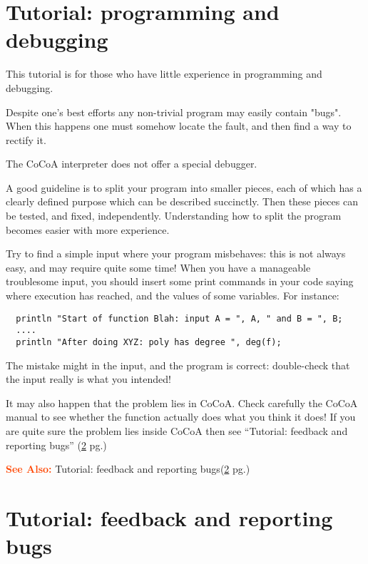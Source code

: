 \documentclass[a4paper]{mybook}
\newcommand\SeeAlso{\par\textcolor{OrangeRed}{\textbf{\large See Also: }}}
\begin{document}
\section{Tutorial: programming and debugging}
\label{Tutorial: programming and debugging}

        
This tutorial is for those who have little experience in
programming and debugging.
\par 
Despite one's best efforts any non-trivial program may easily contain "bugs".
When this happens one must somehow locate the fault,
and then find a way to rectify it.
\par 
The CoCoA interpreter does not offer a special debugger.
\par 
A good guideline is to split your program into smaller pieces,
each of which has a clearly defined purpose which can be described succinctly.
Then these pieces can be tested, and fixed, independently.
Understanding how to split the program becomes easier with more experience.
\par 
Try to find a simple input where your program misbehaves:
this is not always easy, and may require quite some time!
When you have a manageable troublesome input, you should insert
some print commands in your code saying where execution has reached,
and the values of some variables.
For instance:
\begin{verbatim}
  println "Start of function Blah: input A = ", A, " and B = ", B;
  ....
  println "After doing XYZ: poly has degree ", deg(f);
\end{verbatim}
The mistake might in the input, and the program is correct:
double-check that the input really is what you intended!
\par 
It may also happen that the problem lies in CoCoA.
Check carefully the CoCoA manual to see whether the function actually
does what you think it does!
If you are quite sure the problem lies inside CoCoA then see
``Tutorial: feedback and reporting bugs'' (\ref{Tutorial: feedback and reporting bugs} pg.\pageref{Tutorial: feedback and reporting bugs})

\SeeAlso %
  Tutorial: feedback and reporting bugs(\ref{Tutorial: feedback and reporting bugs} pg.\pageref{Tutorial: feedback and reporting bugs})

\section{Tutorial: feedback and reporting bugs}
\label{Tutorial: feedback and reporting bugs}
\end{document}
